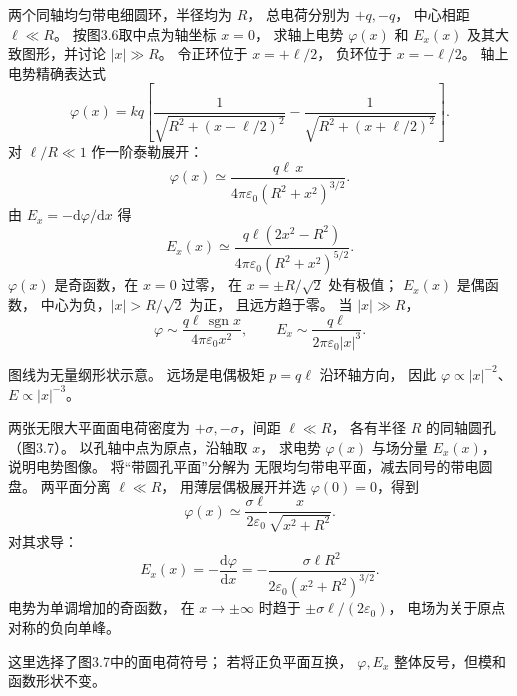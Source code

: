 两个同轴均匀带电细圆环，半径均为 $R$，
总电荷分别为 $+q,-q$，
中心相距 $\ell\ll R$。
按图3.6取中点为轴坐标 $x=0$，
求轴上电势 $\varphi(x)$ 和 $E_x(x)$
及其大致图形，并讨论 $|x|\gg R$。
\exsolution
令正环位于 $x=+\ell/2$，
负环位于 $x=-\ell/2$。
轴上电势精确表达式
\[
\varphi(x)=kq\left[
\frac1{\sqrt{R^2+(x-\ell/2)^2}}
-\frac1{\sqrt{R^2+(x+\ell/2)^2}}\right].
\]
对 $\ell/R\ll1$ 作一阶泰勒展开：
\[
\boxed{\varphi(x)\simeq
\frac{q\ell\,x}{4\pi\varepsilon_0
(R^2+x^2)^{3/2}}}.
\]
由 $E_x=-\mathrm d\varphi/\mathrm dx$ 得
\[
\boxed{E_x(x)\simeq
\frac{q\ell(2x^2-R^2)}
{4\pi\varepsilon_0(R^2+x^2)^{5/2}}}.
\]
$\varphi(x)$ 是奇函数，在 $x=0$ 过零，
在 $x=\pm R/\sqrt2$ 处有极值；
$E_x(x)$ 是偶函数，
中心为负，$|x|>R/\sqrt2$ 为正，
且远方趋于零。
当 $|x|\gg R$，
\[
\boxed{\varphi\sim\frac{q\ell\,\operatorname{sgn}x}
{4\pi\varepsilon_0x^2}},\qquad
\boxed{E_x\sim\frac{q\ell}{2\pi\varepsilon_0|x|^3}}.
\]
\begin{center}
\end{center}
\excheck 图线为无量纲形状示意。
远场是电偶极矩 $p=q\ell$ 沿环轴方向，
因此 $\varphi\propto |x|^{-2}$、
$E\propto|x|^{-3}$。

两张无限大平面面电荷密度为
$+\sigma,-\sigma$，间距 $\ell\ll R$，
各有半径 $R$ 的同轴圆孔（图3.7）。
以孔轴中点为原点，沿轴取 $x$，
求电势 $\varphi(x)$ 与场分量 $E_x(x)$，
说明电势图像。
\exsolution
将“带圆孔平面”分解为
无限均匀带电平面，减去同号的带电圆盘。
两平面分离 $\ell\ll R$，
用薄层偶极展开并选
$\varphi(0)=0$，得到
\[
\boxed{\varphi(x)\simeq
\frac{\sigma\ell}{2\varepsilon_0}
\frac{x}{\sqrt{x^2+R^2}}}.
\]
对其求导：
\[
\boxed{E_x(x)=-\frac{\mathrm d\varphi}{\mathrm dx}
=-\frac{\sigma\ell R^2}
{2\varepsilon_0(x^2+R^2)^{3/2}}}.
\]
电势为单调增加的奇函数，
在 $x\to\pm\infty$ 时趋于
$\pm\sigma\ell/(2\varepsilon_0)$，
电场为关于原点对称的负向单峰。
\begin{center}
\end{center}
\excheck 这里选择了图3.7中的面电荷符号；
若将正负平面互换，
$\varphi,E_x$ 整体反号，但模和函数形状不变。

